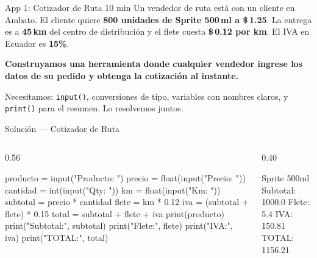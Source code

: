 \documentclass[aspectratio=169, 11pt]{beamer}
\begin{document}
\begin{frame}[fragile]{App 1: Cotizador de Ruta \hfill {\normalsize\color{arcaRed}\faClock\hspace{4pt}10 min}}
  \vspace{-6pt}
  {\small\color{arcaDark}
    Un vendedor de ruta está con un cliente en Ambato.
    El cliente quiere \textbf{800 unidades de Sprite 500\,ml a \$\,1.25}.
    La entrega es a \textbf{45\,km} del centro de distribución
    y el flete cuesta \textbf{\$\,0.12 por km}.
    El IVA en Ecuador es \textbf{15\%}.}

  \vspace{6pt}
  {\small\color{arcaDark}\bfseries
    Construyamos una herramienta donde cualquier vendedor
    ingrese los datos de su pedido y obtenga la cotización al instante.}

  \vspace{6pt}
  {\scriptsize\color{textMuted}
    \faLightbulb[regular]\hspace{4pt}%
    Necesitamos: \texttt{input()}, conversiones de tipo,
    variables con nombres claros, y \texttt{print()} para el resumen.
    Lo resolvemos juntos.}
\end{frame}

\begin{frame}[fragile,shrink=10]{Solución --- Cotizador de Ruta}
  \vspace{-6pt}
  \begin{columns}[T]
    \begin{column}{0.56\textwidth}
      \begin{pyblock}
producto = input("Producto: ")
precio = float(input("Precio: "))
cantidad = int(input("Qty: "))
km = float(input("Km: "))
subtotal = precio * cantidad
flete = km * 0.12
iva = (subtotal + flete) * 0.15
total = subtotal + flete + iva
print(producto)
print("Subtotal:", subtotal)
print("Flete:", flete)
print("IVA:", iva)
print("TOTAL:", total)
      \end{pyblock}
    \end{column}

    \begin{column}{0.40\textwidth}
      \begin{outputblock}
Sprite 500ml
Subtotal: 1000.0
Flete: 5.4
IVA: 150.81
TOTAL: 1156.21
      \end{outputblock}
    \end{column}
  \end{columns}
\end{frame}
\end{document}
